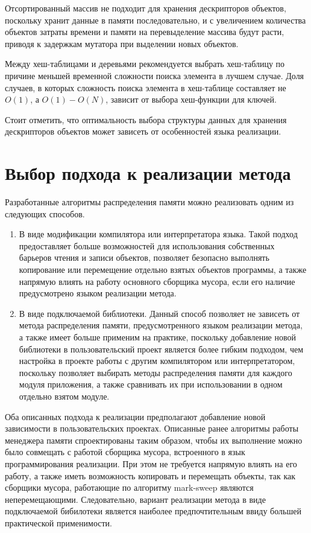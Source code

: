 Отсортированный массив не подходит для хранения дескрипторов объектов, поскольку хранит данные в памяти последовательно, и с увеличением количества объектов затраты времени и памяти на перевыделение массива будут расти, приводя к задержкам мутатора при выделении новых объектов.

Между хеш-таблицами и деревьями рекомендуется выбрать хеш-таблицу по причине меньшей временной сложности поиска элемента в лучшем случае. Доля случаев, в которых сложность поиска элемента в хеш-таблице составляет не $O(1)$, а $O(1)-O(N)$, зависит от выбора хеш-функции для ключей.

Стоит отметить, что оптимальность выбора структуры данных для хранения дескрипторов объектов может зависеть от особенностей языка реализации.

\section{Выбор подхода к реализации метода}

Разработанные алгоритмы распределения памяти можно реализовать одним из следующих способов.

\begin{enumerate}[label*=\arabic*.]
	\item В виде модификации компилятора или интерпретатора языка. Такой подход предоставляет больше возможностей для использования собственных барьеров чтения и записи объектов, позволяет безопасно выполнять копирование или перемещение отдельно взятых объектов программы, а также напрямую влиять на работу основного сборщика мусора, если его наличие предусмотрено языком реализации метода. %
	\item В виде подключаемой библиотеки. Данный способ позволяет не зависеть от метода распределения памяти, предусмотренного языком реализации метода, а также имеет больше применим на практике, поскольку добавление новой библиотеки в пользовательский проект является более гибким подходом, чем настройка в проекте работы с другим компилятором или интерпретатором, поскольку позволяет выбирать методы распределения памяти для каждого модуля приложения, а также сравнивать их при использовании в одном отдельно взятом модуле.
\end{enumerate}

Оба описанных подхода к реализации предполагают добавление новой зависимости в пользовательских проектах. Описанные ранее алгоритмы работы менеджера памяти спроектированы таким образом, чтобы их выполнение можно было совмещать с работой сборщика мусора, встроенного в язык программирования реализации. При этом не требуется напрямую влиять на его работу, а также иметь возможность копировать и перемещать объекты, так как сборщики мусора, работающие по алгоритму mark-sweep являются неперемещающими. Следовательно, вариант реализации метода в виде подключаемой бибилотеки является наиболее предпочтительным ввиду большей практической применимости.

